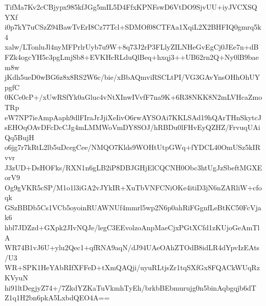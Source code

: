 TifMa7Kv2cCBjypx985kfJGg5mIL5D4FfxKPNFswD6VtDO9SjvUU+iyJVCXSQYXf
i0p7kY7uCSzZ94BawTvErI8Cz77Tcl+SDMOf08CTFAa1XqiL2X2BHFIQ0gmrq5k4
xalw/LTonluJl4nyMFPrlrUyb7u9W+8q73J2rP3FLlyZILNHeGvEgCj0JEe7n+dB
FZk4ogcYH5c3pgLmjSb8+EVKHcRLduQlBeq+hxqj3++UB62rn2Q+Ny0lB9baem8w
jKdh5ueD0wBG6z8x8RS2W6c/bie/xBbAQmviRSCLtPI/VG3GAvYnsOHhOhUYpgfC
0KCe0cP+/xUwRSfYk0aGluc4vNtXInwIVvfF7na9K+6R38NKK8N2mLVHcaZmoTRp
eW7NP7ieAmpAaph9dlFIraJrJjiXeIivO6rwAYSOAi7KKLSAd19hQArTHnSkytcJ
sEHOqOAvDFcDcCJg4mLMMWoVmDY8SOJ/hRBDu0lFHvEyQZHZ/FrvuqUAiQq5BujH
o6jg7r7kRtL2lb5uDcegCee/NMQO7Klds9WOHtUtpGWq+fYDCL40OmUSz5kIRvvr
J3zUD+DsHOFks/RXN1n6gLB2iP8DBJGHjElCQCNH0Obc3htUgJzSbeftMGXEorV9
Og9gVKR5cSP/M1o1l3iGA2vJYkIR+XuTbVNFCNiOKe4itiD3jN6nZARliW+cfoqk
GSzBBDb5Cs1VCb5oyoinRUAWNUf4mmrl5wp2N6p0ahRiFGgnfLeBtKC50FcVjak6
hbl7JDZzd+GXpk2JIvNQJe/legC3EEvolzoAnpMaeCjxPGtXCfd1zKUjoGeAmTlA
WR74B1vJ6U+ylu2Qec1+qfRNA9aqN/dJ94UAeOAhZTOdB8idLR4dYpvIzEAts/U3
WR+SPK1HeYAbRIfXFFeD+tXmQAQji/uyuRLtjsZr1tqSXfGx8FQACkWUqRzKVyuN
hi91ltDegjyZ74+/7ZkdYZKaTuVkmhTyEh/brkbBEbmurujg0n5binAqbgqjb6dT
Z1q1H2bn6pkA5LxbdQEO4A==
